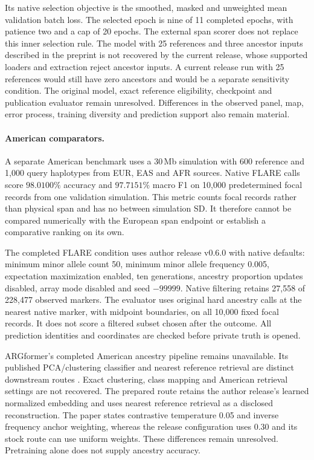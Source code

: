 \documentclass[letterpaper]{article}
\begin{document}
Its native selection objective is the smoothed, masked and unweighted mean validation batch loss. The selected epoch is nine of 11 completed epochs, with patience two and a cap of 20 epochs. The external span scorer does not replace this inner selection rule. The model with 25 references and three ancestor inputs described in the preprint is not recovered by the current release, whose supported loaders and extraction reject ancestor inputs. A current release run with 25 references would still have zero ancestors and would be a separate sensitivity condition. The original model, exact reference eligibility, checkpoint and publication evaluator remain unresolved. Differences in the observed panel, map, error process, training diversity and prediction support also remain material.

\paragraph{American comparators.}
A separate American benchmark uses a 30\,Mb simulation with 600 reference and 1,000 query haplotypes from EUR, EAS and AFR sources. Native FLARE calls score $98.0100\%$ accuracy and $97.7151\%$ macro F1 on 10,000 predetermined focal records from one validation simulation. This metric counts focal records rather than physical span and has no between simulation SD. It therefore cannot be compared numerically with the European span endpoint or establish a comparative ranking on its own.

The completed FLARE condition uses author release v0.6.0 with native defaults: minimum minor allele count 50, minimum minor allele frequency 0.005, expectation maximization enabled, ten generations, ancestry proportion updates disabled, array mode disabled and seed $-99999$. Native filtering retains 27,558 of 228,477 observed markers. The evaluator uses original hard ancestry calls at the nearest native marker, with midpoint boundaries, on all 10,000 fixed focal records. It does not score a filtered subset chosen after the outcome. All prediction identities and coordinates are checked before private truth is opened.

ARGformer's completed American ancestry pipeline remains unavailable. Its published PCA/clustering classifier and nearest reference retrieval are distinct downstream routes \citep{argformer2026}. Exact clustering, class mapping and American retrieval settings are not recovered. The prepared route retains the author release's learned normalized embedding and uses nearest reference retrieval as a disclosed reconstruction. The paper states contrastive temperature 0.05 and inverse frequency anchor weighting, whereas the release configuration uses 0.30 and its stock route can use uniform weights. These differences remain unresolved. Pretraining alone does not supply ancestry accuracy.
\end{document}
